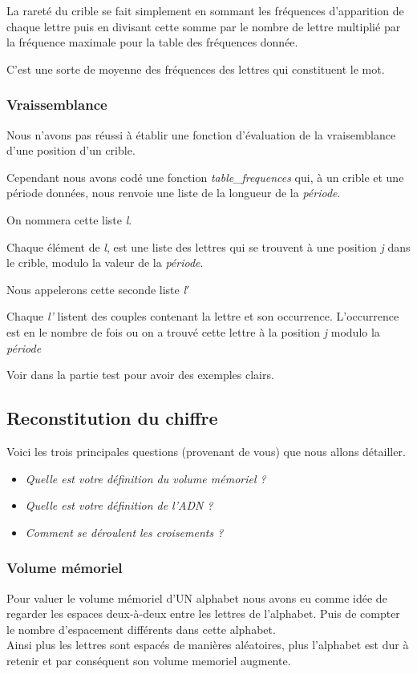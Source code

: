\documentclass[a4paper, 11pt]{article}
\begin{document}
La rareté du crible se fait simplement en sommant les fréquences
d'apparition de chaque lettre puis en divisant cette somme par le
nombre de lettre multiplié par la fréquence maximale pour la table des
fréquences donnée.

C'est une sorte de moyenne des fréquences des lettres qui constituent
le mot.

\subsubsection{Vraissemblance}
Nous n'avons pas réussi à établir une fonction d'évaluation de la
vraisemblance d'une position d'un crible.

Cependant nous avons codé une fonction \textit{table\_frequences} qui, à un
crible et une période données, nous renvoie une liste de la longueur
de la \textit{période}.

On nommera cette liste \textit{l}.

Chaque élément de \textit{l}, est une liste des
lettres qui se trouvent à une position \textit{j} dans le crible, modulo
la valeur de la \textit{période}.

Nous appelerons cette seconde liste \textit{l$'$}

Chaque \textit{l'} listent des couples contenant la lettre et son
occurrence. L'occurrence est en le nombre de fois ou on a trouvé cette
lettre à la position \textit{j} modulo la \textit{période}

Voir dans la partie test pour avoir des exemples clairs.



\subsection{Reconstitution du chiffre}

Voici les trois principales questions (provenant de vous) que nous
allons détailler.\\

\begin{itemize}
\item \emph{Quelle est votre définition du volume mémoriel ?}
\item \emph{Quelle est votre définition de l'ADN ?}
\item \emph{Comment se déroulent les croisements ?}
\end{itemize}


\subsubsection{Volume mémoriel}
Pour valuer le volume mémoriel d'UN alphabet nous avons eu comme idée
de regarder les espaces deux-à-deux entre les lettres de
l'alphabet. Puis de compter le nombre d'espacement différents dans
cette alphabet.\\
Ainsi plus les lettres sont espacés de manières aléatoires, plus
l'alphabet est dur à retenir et par conséquent son volume memoriel
augmente.\\
\end{document}
